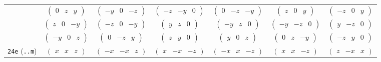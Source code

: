 \documentclass[fleqn,9pt,landscape]{jsarticle}
\begin{document}
\begin{center}
\begin{longtable}{ccccccc}
& $ \begin{pmatrix} 0 & z & y \end{pmatrix} $ & $ \begin{pmatrix} - y & 0 & - z \end{pmatrix} $ & $ \begin{pmatrix} - z & - y & 0 \end{pmatrix} $ & $ \begin{pmatrix} 0 & - z & - y \end{pmatrix} $ & $ \begin{pmatrix} z & 0 & y \end{pmatrix} $ & $ \begin{pmatrix} - z & 0 & y \end{pmatrix} $ \\
& $ \begin{pmatrix} z & 0 & - y \end{pmatrix} $ & $ \begin{pmatrix} - z & 0 & - y \end{pmatrix} $ & $ \begin{pmatrix} y & z & 0 \end{pmatrix} $ & $ \begin{pmatrix} - y & z & 0 \end{pmatrix} $ & $ \begin{pmatrix} - y & - z & 0 \end{pmatrix} $ & $ \begin{pmatrix} y & - z & 0 \end{pmatrix} $ \\
& $ \begin{pmatrix} - y & 0 & z \end{pmatrix} $ & $ \begin{pmatrix} 0 & - z & y \end{pmatrix} $ & $ \begin{pmatrix} z & y & 0 \end{pmatrix} $ & $ \begin{pmatrix} y & 0 & z \end{pmatrix} $ & $ \begin{pmatrix} 0 & z & - y \end{pmatrix} $ & $ \begin{pmatrix} - z & y & 0 \end{pmatrix} $ \\ \hline
{\tt 24e} ({\tt ..m}) & $ \begin{pmatrix} x & x & z \end{pmatrix} $ & $ \begin{pmatrix} - x & - x & z \end{pmatrix} $ & $ \begin{pmatrix} x & - x & - z \end{pmatrix} $ & $ \begin{pmatrix} - x & x & - z \end{pmatrix} $ & $ \begin{pmatrix} x & x & - z \end{pmatrix} $ & $ \begin{pmatrix} z & - x & x \end{pmatrix} $ \\

\end{longtable}
\end{center}
\end{document}
